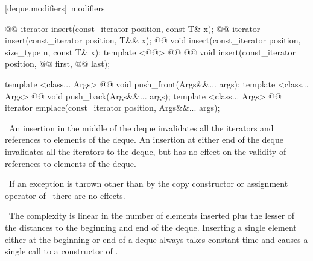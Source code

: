 \documentclass[american,twoside]{book}
\begin{document}
[deque.modifiers]{\ modifiers}

%
%
%
%
\begin{itemdecl}
@@
  iterator insert(const_iterator position, const T& x);
@@
  iterator insert(const_iterator position, T&& x);
@@
  void     insert(const_iterator position, size_type n, const T& x);
template <@@>
  @@
           @@
  void insert(const_iterator position,
              @@ first, @@ last);

template <class... Args> 
  @@ 
  void push_front(Args&&... args);
template <class... Args> 
  @@ 
  void push_back(Args&&... args);
template <class... Args> 
  @@ 
  iterator emplace(const_iterator position, Args&&... args);
\end{itemdecl}

\begin{itemdescr}
\pnum
\effects\ 
An insertion in the middle of the deque invalidates all the iterators and
references to elements of the deque.
An insertion at either end of the
deque invalidates all the iterators to the deque, but has no effect on
the validity of references to elements of the deque.

\pnum
\notes\ 
If an exception is thrown other than by the
copy constructor or assignment operator of
\
there are no effects.

\pnum
\complexity\ 
The complexity is linear in the number of elements inserted plus the lesser
of the distances to the beginning and end of the deque.
Inserting a single element either at the beginning or end of a deque always takes constant time
and causes a single call to a constructor of
\tcode{T}.
\end{itemdescr}
\end{document}
